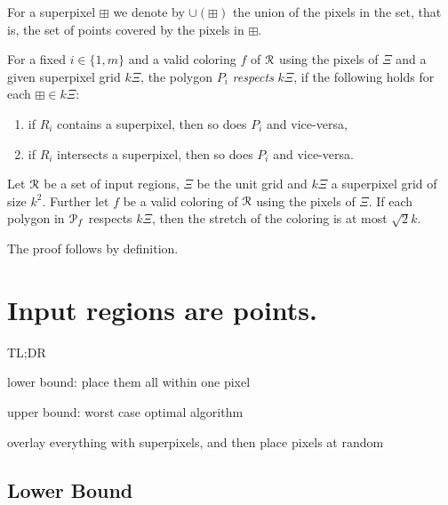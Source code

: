 \documentclass[a4paper, UKenglish]{lipics-v2018}
\newcommand{\mremark}[3]{\textcolor{blue}{\textsc{#1 #2:}} \textcolor{SeaGreen}{\textsf{#3}}}
\newcommand{\maarten}[2][says]{\mremark{Maarten}{#1}{#2}}
\newcommand{\pix}{\square}
\newcommand{\spix}{\boxplus}
\begin{document}
For a superpixel $\spix$ we denote by $\cup(\spix)$ the union of the pixels in the set, that is, the set of points covered by the pixels in $\spix$. 

\begin{definition}
For a fixed $i\in \{1, m\}$ and a valid coloring $f$ of $\cal R$ using the pixels of $\Xi$ and a given superpixel grid $k\Xi$, the polygon $P_i$ \emph{respects} $k\Xi$, if the following holds for each $\spix\in k\Xi$:
\begin{enumerate}
	\item if $R_i$ contains a superpixel, then so does $P_i$ and vice-versa,
	\item if $R_i$ intersects a superpixel, then so does $P_i$ and vice-versa.
\end{enumerate}
\end{definition}

\begin{lemma}\label{lem:respect_means_bound}
Let $\cal R$ be a set of input regions, $\Xi$ be the unit grid and $k\Xi$ a superpixel grid of size $k^2$. Further let $f$ be a valid coloring of $\cal R$ using the pixels of $\Xi$.
If each polygon in ${\cal P}_f$ respects $k\Xi$, then the stretch of the coloring is at most $\sqrt{2}k$.
\end{lemma}
The proof follows by definition.

\section{Input regions are points.}
\label{sec:points}

TL;DR

lower bound:
place them all within one pixel

upper bound: worst case optimal algorithm

overlay everything with superpixels, and then place pixels at random

\subsection{Lower Bound}
\label{sub:points_lower}
\end{document}
